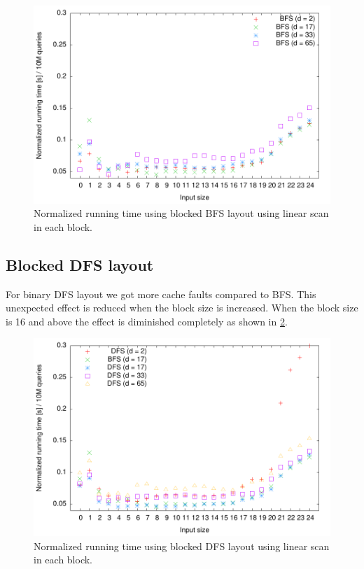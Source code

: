 \begin{figure}[h!]

  \centering
  \includegraphics[width=\textwidth]{../week1/plots/outputs/Btree_lin_runningtime}
  \caption{Normalized running time using blocked BFS layout using linear scan in each block.}
  \label{fig:blocked_bfs_lin_runningtime}
\end{figure}

\subsection{Blocked DFS layout}

For binary DFS layout we got more cache faults compared to BFS. This unexpected effect is reduced when the block size is increased. When the block size is 16 and above the effect is diminished completely as shown in \ref{fig:blocked_dfs_lin_runningtime}.

\begin{figure}[h!]
  \centering
  \includegraphics[width=\textwidth]{../week1/plots/outputs/DFS_runningtime}
  \caption{Normalized running time using blocked DFS layout using linear scan in each block.}
  \label{fig:blocked_dfs_lin_runningtime}
\end{figure}


